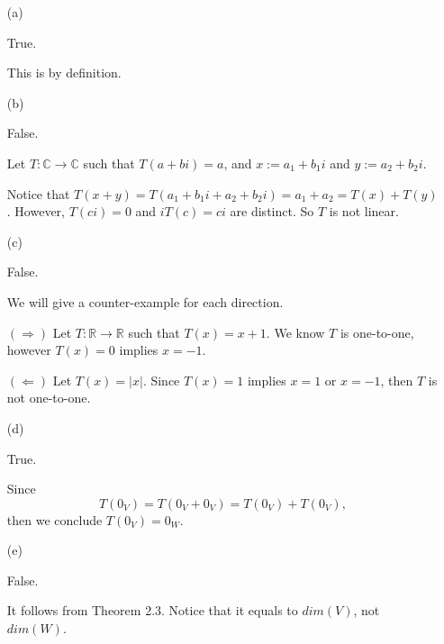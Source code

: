 \begin{Exercise}
\begin{enumerate}[(a)]
\item[(a)]
\begin{answer}
True.
\end{answer}
\begin{solution}
This is by definition.
\end{solution}

\item[(b)]
\begin{answer}
False.
\end{answer}
\begin{solution}
Let $T:\mathbb{C}\to\mathbb{C}$ such that $T(a+b i) = a$, and $x := a_1 + b_1 i$ and $y := a_2 + b_2 i$.

Notice that $T(x+y) = T(a_1 + b_1 i + a_2 + b_2 i) = a_1 + a_2 = T(x) + T(y)$. However, $T(c i) = 0$ and $i T(c) = c i$ are distinct. So $T$ is not linear.
\end{solution}

\item[(c)]
\begin{answer}
False.
\end{answer}
\begin{solution}
We will give a counter-example for each direction.

$(\Longrightarrow)$
Let $T:\mathbb{R}\to\mathbb{R}$ such that $T(x) = x+1$. We know $T$ is one-to-one, however $T(x) = 0$ implies $x=-1$.

\vspace{2ex}

$(\Longleftarrow)$
Let $T(x) = |x|$. Since $T(x) = 1$ implies $x = 1$ or $x=-1$, then $T$ is not one-to-one.
\end{solution}

\item[(d)]
\begin{answer}
True.
\end{answer}
\begin{solution}
Since
$$
T(0_V) = T(0_V+0_V) = T(0_V) + T(0_V),
$$
then we conclude $T(0_V) = 0_W$.
\end{solution}

\item[(e)]
\begin{answer}
False.
\end{answer}
\begin{solution}
It follows from Theorem 2.3. Notice that it equals to $dim(V)$, not $dim(W)$.
\end{solution}


\end{enumerate}
\end{Exercise}
